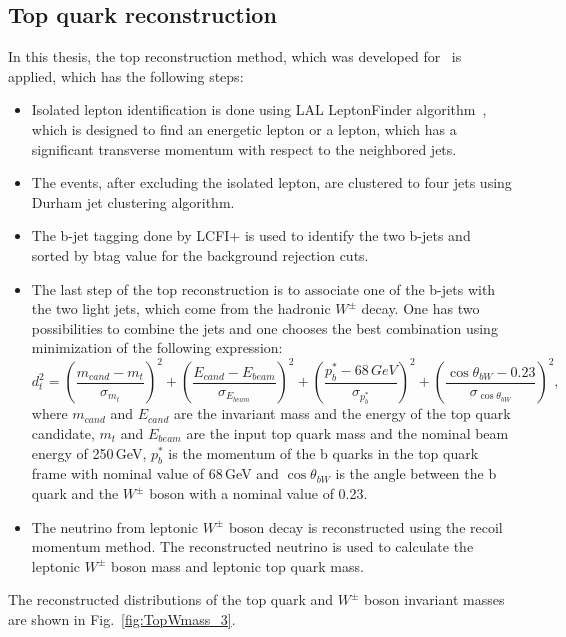\subsection{Top quark reconstruction}
In this thesis, the top reconstruction method, which was developed for~\cite{bib:ILCTOP} is applied, which has the following steps:
\begin{itemize}
	\item Isolated lepton identification is done using LAL LeptonFinder algorithm~\cite{bib:Doublet}, which is designed to find an energetic lepton or a lepton, which has a significant transverse momentum with respect to the neighbored jets. 
	\item The events, after excluding the isolated lepton, are clustered to four jets using Durham jet clustering algorithm.
	\item The b-jet tagging done by LCFI+ is used to identify the two b-jets and sorted by btag value for the background rejection cuts. 
	\item The last step of the top reconstruction is to associate one of the b-jets with the two light jets, which come from the hadronic $W^\pm$ decay.  One has two possibilities to combine the jets and one chooses the best combination using minimization of the following expression:
	\begin{equation}
	\label{formula:Chi2Top_3}
	d^2_{t} = (\frac{m_{cand}-m_{t}}{\sigma_{m_t}})^2 + (\frac{E_{cand}-E_{beam}}{\sigma_{E_{beam}}})^2+(\frac{p^*_b-68\,GeV}{\sigma_{p^*_b}})^2 + (\frac{\cos\theta_{bW}-0.23}{\sigma_{\cos\theta_{bW}}})^2,
	\end{equation}
	where $m_{cand}$ and $E_{cand}$ are the invariant mass and the energy of the top quark candidate, $m_t$ and $E_{beam}$ are the input top quark mass and the nominal beam energy of 250\,GeV, $p^*_b$ is the momentum of the b quarks in the top quark frame with nominal value of 68\,GeV and $\cos\theta_{bW}$ is the angle between the b quark and the $W^\pm$ boson with a nominal value of 0.23.
	\item The neutrino from leptonic $W^\pm$ boson decay is reconstructed using the recoil momentum method. The reconstructed neutrino is used to calculate the leptonic $W^\pm$ boson mass and leptonic top quark mass. 
\end{itemize}

The reconstructed distributions of the top quark and $W^\pm$ boson invariant masses are shown in Fig.~\ref{fig:TopWmass_3}.

